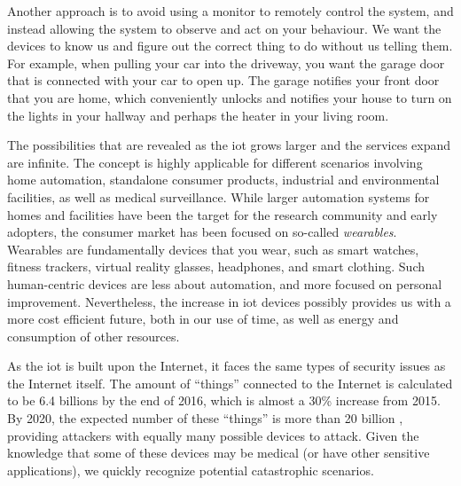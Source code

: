 Another approach is to avoid using a monitor to remotely control the system, and instead allowing the system to observe and act on your behaviour. We want the devices to know us and figure out the correct thing to do without us telling them. For example, when pulling your car into the driveway, you want the garage door that is connected with your car to open up. The garage notifies your front door that you are home, which conveniently unlocks and notifies your house to turn on the lights in your hallway and perhaps the heater in your living room.



The possibilities that are revealed as the \gls{iot} grows larger and the services expand are infinite. The concept is highly applicable for different scenarios involving home automation, standalone consumer products, industrial and environmental facilities, as well as medical surveillance. While larger automation systems for homes and facilities have been the target for the research community and early adopters, the consumer market has been focused on so-called \emph{wearables}. Wearables are fundamentally devices that you wear, such as smart watches, fitness trackers, virtual reality glasses, headphones, and smart clothing. Such human-centric devices are less about automation, and more focused on personal improvement. Nevertheless, the increase in \gls{iot} devices possibly provides us with a more cost efficient future, both in our use of time, as well as energy and consumption of other resources.


As the \gls{iot} is built upon the Internet, it faces the same types of security issues as the Internet itself. The amount of ``things'' connected to the Internet is calculated to be 6.4 billions by the end of 2016, which is almost a 30\% increase from 2015. By 2020, the expected number of these ``things'' is more than 20 billion \cite{iot-gartner}, providing attackers with equally many possible devices to attack. Given the knowledge that some of these devices may be medical (or have other sensitive applications), we quickly recognize potential catastrophic scenarios.


